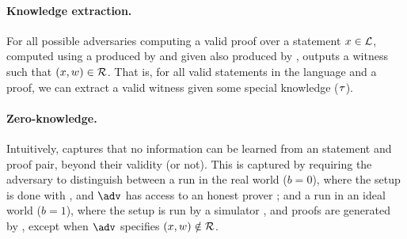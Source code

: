 \paragraph{Knowledge extraction.} %
For all possible adversaries computing a valid proof \NIZKproof over a statement
$x \in \mathcal{L}$, computed using a \NIZKcrs produced by \ExtI and given
\NIZKext also produced by \ExtI, \ExtII outputs a witness \NIZKw such that
$(x,w) \in \mathcal{R}$. That is, for all valid statements in the
language and a proof, we can extract a valid witness given some special
knowledge ($\tau$). 

\paragraph{Zero-knowledge.} %
Intuitively, captures that no information can be learned from an statement and
proof pair, beyond their validity (or not). This is captured by requiring the
adversary to distinguish between a run in the real world ($b=0$), where the
setup is done with \Setup, and $\adv$ has access to an honest prover
\Prove; and a run in an ideal world ($b=1$), where the setup is run by
a simulator \SimI, and proofs are generated by \SimII, except when $\adv$
specifies $(x,w) \notin \mathcal{R}$.

